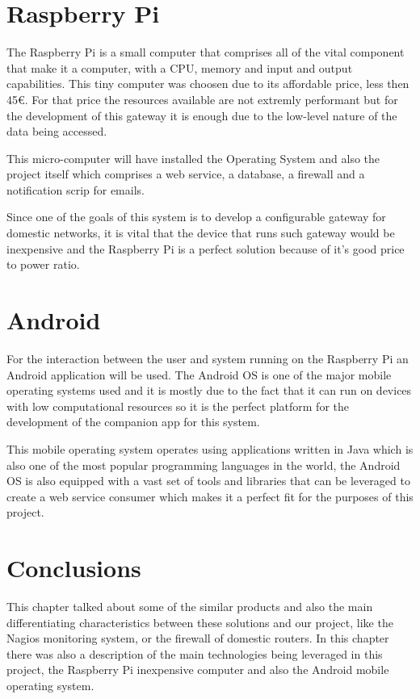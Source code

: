 
\section{Raspberry Pi}
\label{chap2:sec:rasp}
The Raspberry Pi is a small computer that comprises all of the vital component
that make it a computer, with a CPU, memory and input and output capabilities.
This tiny computer was choosen due to its affordable price, less then 45€. For
that price the resources available are not extremly performant but for the
development of this gateway it is enough due to the low-level nature of the data
being accessed.

This micro-computer will have installed the Operating System and also the
project itself which comprises a web service, a database, a firewall and a
notification scrip for emails.

Since one of the goals of this system is to develop a configurable gateway for
domestic networks, it is vital that the device that runs such gateway would be
inexpensive and the Raspberry Pi is a perfect solution because of it's good
price to power ratio.

\section{Android}
\label{chap2:sec:android}
For the interaction between the user and system running on the Raspberry Pi an
Android application will be used. The Android OS is one of the major mobile
operating systems used and it is mostly due to the fact that it can run on
devices with low computational resources so it is the perfect platform for the
development of the companion app for this system.

This mobile operating system operates using applications written in Java which
is also one of the most popular programming languages in the world, the Android
OS is also equipped with a vast set of tools and libraries that can be leveraged
to create a web service consumer which makes it a perfect fit for the purposes
of this project.


\section{Conclusions}
\label{chap2:sec:concs}
This chapter talked about some of the similar products and also the main
differentiating characteristics between these solutions and our project, like
the Nagios monitoring system, or the firewall of domestic routers.
In this chapter there was also a description of the main technologies being
leveraged in this project, the Raspberry Pi inexpensive computer and also the
Android mobile operating system.
